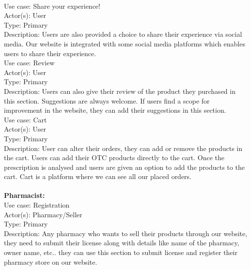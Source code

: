 \documentclass{article}
\begin{document}
\vspace{0.5cm}
\\Use case:    Share your experience!\\
Actor(s):      User                \\                           
Type:            Primary     \\                                     
 Description: Users are also provided a choice to share their experience via social media. Our website is integrated with some social media platforms which enables users to share their experience.   
\vspace{0.5cm}
\\Use case:    Review\\
Actor(s):       User     \\                                       
Type:             Primary  \\                                     
 Description:  Users can also give their review of the product they purchased in this section. Suggestions are always welcome. If users find a scope for improvement in the website, they can add their suggestions in this section.
\vspace{0.5cm}
\\Use case:    Cart	\\			                                 
Actor(s):      User   \\                                            
Type:            Primary \\                                           
  Description:  User can alter their orders, they can add or remove the products in the cart. Users can add their OTC products directly to the cart. Once the prescription is analysed and users are given an option to add the products to the cart. Cart is a platform where we can see all our placed orders.\\
\vspace{1.0cm}
\\\textbf{Pharmacist:}
\vspace{0.5cm}
\\Use case:   Registration\\
Actor(s):     Pharmacy/Seller\\                                        
  Type:           Primary        \\                                      
Description:  Any pharmacy who wants to sell their products through our website, they need to submit their license along with details like name of the pharmacy, owner name, etc.. they can use this section to submit license and register their pharmacy store on our website.
\end{document}

